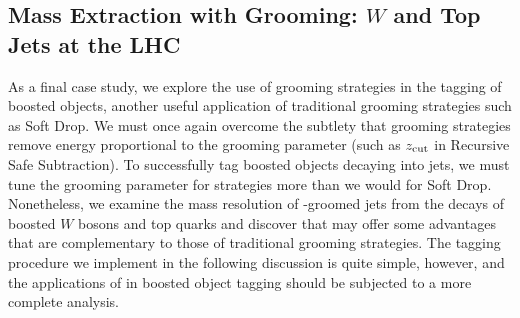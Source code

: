\subsection{Mass Extraction with Grooming: \texorpdfstring{\(W\)}{W} and Top Jets at the LHC}
\label{sec:pira-mass}
    As a final case study, we explore the use of \PIRANHA{} grooming strategies in the tagging of boosted objects, another useful application of traditional grooming strategies such as Soft Drop.
   We must once again overcome the subtlety that \PIRANHA{} grooming strategies remove energy proportional to the grooming parameter (such as \(z_{\rm cut}\) in Recursive Safe Subtraction).
   To successfully tag boosted objects decaying into jets, we must tune the grooming parameter for \PIRANHA{} strategies more than we would for Soft Drop.
   Nonetheless, we examine the mass resolution of \PIRANHA{}-groomed jets from the decays of boosted \(W\) bosons and top quarks and discover that \PIRANHA{} may offer some advantages that are complementary to those of traditional grooming strategies.
   The tagging procedure we implement in the following discussion is quite simple, however, and the applications of \PIRANHA{} in boosted object tagging should be subjected to a more complete analysis.

